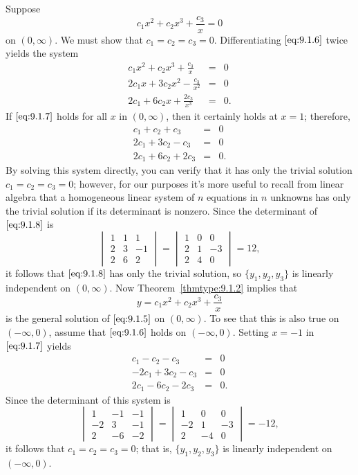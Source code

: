 \documentclass{ximera}
\begin{document}
\begin{example}
\begin{explanation}
Suppose
\begin{equation} \label{eq:9.1.6}
c_1x^2+c_2x^3+\frac{c_3}{x}=0
\end{equation}
on $(0,\infty)$. We must show that $c_1=c_2=c_3=0$. Differentiating
$\eqref{eq:9.1.6}$ twice yields  the system
\begin{equation} \label{eq:9.1.7}
\begin{array}{rcl}
c_1x^2+c_2x^3+\frac{c_3}{x}&=&0\\
2c_1x+3c_2x^2-\frac{c_3}{x^2}&=&0\\
2c_1+6c_2x+\frac{2c_3}{x^3}&=&0.
\end{array}
\end{equation}
If $\eqref{eq:9.1.7}$ holds for all $x$ in $(0,\infty)$, then it
certainly  holds at $x=1$;  therefore,
\begin{equation} \label{eq:9.1.8}
\begin{array}{rcl}
c_1+c_2+c_3&=&0\\
2c_1+3c_2-c_3&=&0\\
2c_1+6c_2+2c_3&=&0.
\end{array}
\end{equation}
By solving this system directly, you can verify that it has only the
trivial solution $c_1=c_2=c_3=0$;     however, for our purposes it's more
useful to recall from linear algebra that a homogeneous linear system
of $n$ equations in $n$ unknowns has only the trivial solution if its
determinant is nonzero. Since the determinant of $\eqref{eq:9.1.8}$ is
$$
\begin{vmatrix}1&1&1\\2&3&-1\\2&6&2\end{vmatrix}=
\begin{vmatrix}1&0&0\\2&1&-3\\2&4&0\end{vmatrix}=12,
$$
it follows that $\eqref{eq:9.1.8}$ has only the trivial solution, so
$\{y_1,y_2,y_3\}$ is linearly independent on $(0,\infty)$. Now
Theorem~\ref{thmtype:9.1.2} implies that
$$
y=c_1x^2+c_2x^3+\frac{c_3}{x}
$$
is the general solution of $\eqref{eq:9.1.5}$ on $(0,\infty)$.
To see that this is also true
on $(-\infty,0)$,  assume that $\eqref{eq:9.1.6}$ holds on
$(-\infty,0)$. Setting $x=-1$ in $\eqref{eq:9.1.7}$ yields
\begin{eqnarray*}
c_1-c_2-c_3&=&0\\
-2c_1+3c_2-c_3&=&0\\
2c_1-6c_2-2c_3&=&0.
\end{eqnarray*}
Since the determinant of this system is
$$
\begin{vmatrix}1&-1&-1\\-2&3&-1\\2&-6&-2\end{vmatrix}=
\begin{vmatrix}1&0&0\\-2&1&-3\\2&-4&0\end{vmatrix}=-12,
$$
it follows that $c_1=c_2=c_3=0$; that is, $\{y_1,y_2,y_3\}$
is linearly independent on $(-\infty,0)$.


\end{explanation}
\end{example}
\end{document}
